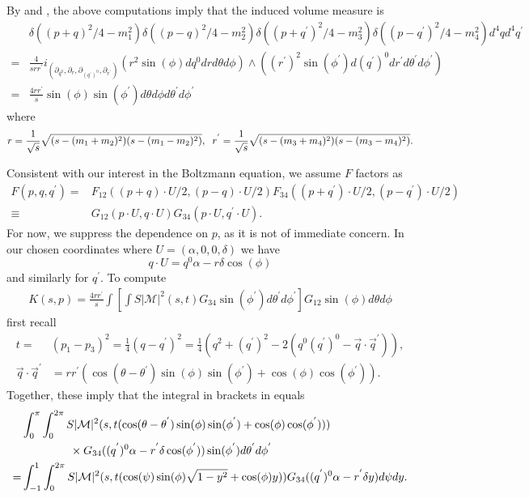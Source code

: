By  and , the above computations imply that the induced volume measure is
\begin{align}
&\delta((p+q)^2/4-m_1^2)\delta((p-q)^2/4-m_2^2)\delta((p+q^{'})^2/4-m_3^2)\delta((p-q^{'})^2/4-m_4^2)d^4qd^4q^{'}\\
=&\frac{4}{srr^{'}}i_{(\partial_{q^0},\partial_{r},\partial _{(q^{'})^0},\partial_{r^{'}})}\left(r^2\sin(\phi)dq^0drd\theta d\phi\right)\wedge\left((r^{'})^2\sin(\phi^{'})d(q^{'})^0dr^{'}d\theta^{'}d\phi^{'}\right)\\
=&\frac{4rr^{'}}{s}\sin(\phi)\sin(\phi^{'})d\theta d\phi d\theta^{'}d\phi^{'}
\end{align}
where
\begin{equation}
r=\frac{1}{\sqrt{s}}\sqrt{(s-(m_1+m_2)^2)(s-(m_1-m_2)^2)},\hspace{2mm} r^{'}=\frac{1}{\sqrt{s}}\sqrt{(s-(m_3+m_4)^2)(s-(m_3-m_4)^2)}.
\end{equation}


Consistent with our interest in the Boltzmann equation, we assume $F$ factors as
\begin{align}
 F(p,q,q^{'})=&F_{12}((p+q)\cdot U/2,(p-q)\cdot U/2)F_{34}((p+q^{'})\cdot U/2,(p-q^{'})\cdot U/2)\\
\equiv &G_{12}(p\cdot U,q\cdot U)G_{34}(p\cdot U,q^{'}\cdot U).
\end{align}
For now, we suppress the dependence on $p$, as it is not of immediate concern. In our chosen coordinates where $U=(\alpha,0,0,\delta)$ we have
\begin{equation}
q\cdot U=q^0\alpha-r\delta\cos(\phi)
\end{equation}
and similarly for $q^{'}$.
To compute
\begin{align}\label{K_angular1}
K(s,p)=\frac{4rr^{'}}{s}\int \left[\int S |\mathcal{M}|^2 (s,t) G_{34}\sin(\phi^{'})d\theta^{'} d\phi^{'}\right] G_{12}\sin(\phi)d\theta d\phi
\end{align}
first recall 
\begin{align}
t=&(p_1-p_3)^2=\frac{1}{4}(q- q^{'})^2=\frac{1}{4}(q^2+(q^{'})^2-2(q^0(q^{'})^0-\vec{q}\cdot \vec{q}^{'})),\\
\vec{q}\cdot\vec{q}^{'}&=rr^{'}(\cos(\theta-\theta^{'})\sin(\phi)\sin(\phi^{'})+\cos(\phi)\cos(\phi^{'})).
\end{align}
Together, these imply that the integral in brackets in   equals
{\small
\begin{align}
&\int_0^\pi\int_0^{2\pi} S |\mathcal{M}|^2 (s,t(\cos(\theta-\theta^{'})\sin(\phi)\sin(\phi^{'})+\cos(\phi)\cos(\phi^{'})))\\
&\hspace{15mm}\times G_{34}((q^{'})^0\alpha-r^{'}\delta\cos(\phi^{'}))\sin(\phi^{'})d\theta^{'} d\phi^{'}\notag\\
=&\int_{-1}^1\int_0^{2\pi} S |\mathcal{M}|^2 (s,t(\cos(\psi)\sin(\phi)\sqrt{1-y^2}+\cos(\phi)y)) G_{34}((q^{'})^0\alpha-r^{'}\delta y)d\psi dy.
\end{align}
}

